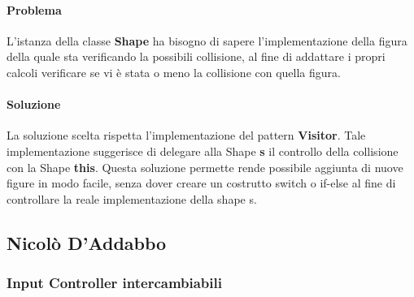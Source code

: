 \documentclass[a4paper,12pt]{report}
\begin{document}
\paragraph*{Problema} L'istanza della classe \textbf{Shape} ha bisogno di sapere l'implementazione della figura della quale sta verificando la possibili collisione, al fine di addattare i propri calcoli verificare se vi è stata o meno la collisione con quella figura. 
%
\paragraph*{Soluzione} La soluzione scelta rispetta l'implementazione del pattern \textbf{Visitor}.
Tale implementazione suggerisce di delegare alla Shape \textbf{s} il controllo della collisione con la Shape \textbf{this}.
Questa soluzione permette rende possibile aggiunta di nuove figure in modo facile, senza dover creare un costrutto switch o if-else al fine di controllare la reale implementazione della shape s.

\subsection*{Nicolò D'Addabbo}

\subsubsection{Input Controller intercambiabili}
\end{document}
